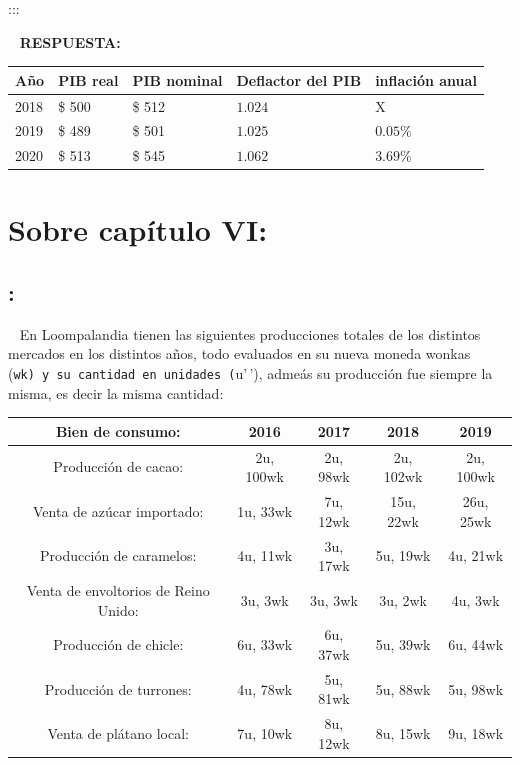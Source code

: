 \documentclass[
  letterpaper,
  DIV=11,
  numbers=noendperiod]{scrreport}
\begin{document}
:::

~ \textbf{RESPUESTA:}

\begin{table}[h]
    \centering
    \begin{tabular}{|p{25mm}|p{25mm}|p{25mm}|p{25mm}|p{25mm}|}
        \hline
        Año & PIB real & PIB nominal & Deflactor del PIB & inflación anual\\ \hline
        2018 & \$ 500 & \$ 512 & $ 1.024 $ & \hspace{11.5mm}X \\ \hline
        2019 & \$ 489 & \$ 501 & $1.025$ & $0.05$\%\\ \hline
        2020 & \$ 513 & \$ 545 & $1.062$ & $3.69$\% \\ \hline
    \end{tabular}
\end{table}

\hypertarget{sobre-capuxedtulo-vi}{%
\section{Sobre capítulo VI:}\label{sobre-capuxedtulo-vi}}

\hypertarget{section-33}{%
\subsection{:}\label{section-33}}

~ En Loompalandia tienen las siguientes producciones totales de los
distintos mercados en los distintos años, todo evaluados en su nueva
moneda wonkas
(\texttt{wk\textquotesingle{}\textquotesingle{})\ y\ su\ cantidad\ en\ unidades\ (}u'\,'),
admeás su producción fue siempre la misma, es decir la misma cantidad:

\begin{table}[h]
    \centering
    \begin{tabular}{|c|c|c|c|c|}
        \hline
        Bien de consumo: & 2016 & 2017 & 2018 & 2019 \\\hline
        Producción de cacao: & 2u, 100wk & 2u, 98wk & 2u, 102wk & 2u, 100wk \\\hline
        Venta de azúcar importado: & 1u, 33wk & 7u, 12wk & 15u, 22wk & 26u, 25wk\\\hline
        Producción de caramelos: & 4u, 11wk & 3u, 17wk & 5u, 19wk & 4u, 21wk\\\hline
        Venta de envoltorios de Reino Unido: & 3u, 3wk & 3u, 3wk & 3u, 2wk & 4u, 3wk\\\hline
        Producción de chicle: & 6u, 33wk & 6u, 37wk & 5u, 39wk & 6u, 44wk\\\hline
        Producción de turrones: & 4u, 78wk & 5u, 81wk & 5u, 88wk & 5u, 98wk\\\hline
        Venta de plátano local: & 7u, 10wk & 8u, 12wk & 8u, 15wk & 9u, 18wk\\\hline
    \end{tabular}
\end{table}
\end{document}

